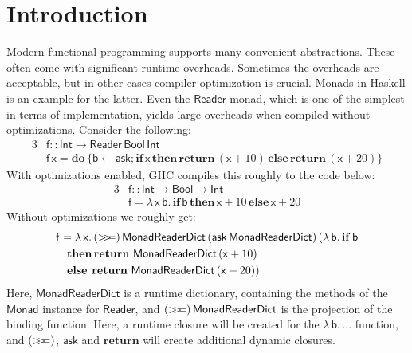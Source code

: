 \documentclass[acmsmall,screen,review,anonymous]{acmart}
\newcommand{\msf}[1]{{\mathsf{#1}}}
\newcommand{\mbf}[1]{{\mathbf{#1}}}
\newcommand{\mdo}{\mbf{do}\,}
\newcommand{\ind}{\hspace{1em}}
\newcommand{\bif}{\mbf{if}\,}
\newcommand{\bthen}{\mbf{then}\,}
\newcommand{\belse}{\mbf{else}\,}
\newcommand{\return}{\mbf{return}\,}
\newcommand{\lam}{\lambda\,}
\newcommand{\vb}{\mathsf{b}}
\newcommand{\vx}{\mathsf{x}}
\newcommand{\vf}{\mathsf{f}}
\newcommand{\Int}{\msf{Int}}
\newcommand{\Reader}{\msf{Reader}}
\newcommand{\Monad}{\msf{Monad}}
\newcommand{\Bool}{\msf{Bool}}
\newcommand{\fro}{\leftarrow}
\newcommand{\bind}{\mathbin{>\!\!>\mkern-6.7mu=}}
\theoremstyle{remark}
\begin{document}


\maketitle


\section{Introduction}\label{sec:introduction}

Modern functional programming supports many convenient abstractions. These often
come with significant runtime overheads. Sometimes the overheads are acceptable,
but in other cases compiler optimization is crucial. Monads in Haskell is an
example for the latter. Even the $\Reader$ monad, which is one of the simplest
in terms of implementation, yields large overheads when compiled without
optimizations. Consider the following:
\begin{alignat*}{3}
  &\vf :: \Int \to \Reader\,\Bool\,\Int \\
  &\vf\,\vx = \mdo\{\vb \fro \msf{ask}; \bif \vx\, \bthen \return (\vx + 10)\, \belse \return (\vx + 20)\}
\end{alignat*}
With optimizations enabled, GHC compiles this roughly to the code below:
\begin{alignat*}{3}
  &\vf :: \Int \to \Bool \to \Int \\
  &\vf = \lam \vx\,\vb.\, \bif \vb\, \bthen \vx + 10\, \belse \vx + 20
\end{alignat*}
Without optimizations we roughly get:
\begin{alignat*}{3}
  &\vf = \lam \vx.\,(\bind)\,\msf{MonadReaderDict}\,(\msf{ask}\,\msf{MonadReaderDict})\,(\lam \vb.\,\bif \vb\\
  &\ind \bthen\return\,\msf{MonadReaderDict}\,(\vx + 10)\\
  &\ind \belse\hspace{0.25em}\return\,\msf{MonadReaderDict}\,(\vx + 20))
\end{alignat*}
Here, $\msf{MonadReaderDict}$ is a runtime dictionary, containing the methods of
the $\Monad$ instance for $\Reader$, and $(\bind)\,\msf{MonadReaderDict}$ is the
projection of the binding function. Here, a runtime closure will be created for
the $\lam \vb.\,...$ function, and $(\bind)$, $\msf{ask}$ and $\mbf{return}$
will create additional dynamic closures.
\end{document}

